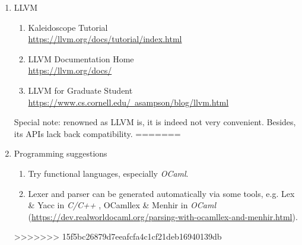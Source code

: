 \documentclass{article}
\begin{document}
\begin{enumerate}
    \item LLVM
    \begin{enumerate}
        \item Kaleidoscope Tutorial\\
        \href{https://llvm.org/docs/tutorial/index.html}{https://llvm.org/docs/tutorial/index.html}
        \item LLVM Documentation Home\\
        \href{https://llvm.org/docs/}{https://llvm.org/docs/}
        \item LLVM for Graduate Student\\
        \href{https://www.cs.cornell.edu/~asampson/blog/llvm.html}{https://www.cs.cornell.edu/~asampson/blog/llvm.html}
    \end{enumerate}    
    Special note: renowned as LLVM is, it is indeed not very convenient. Besides, its APIs lack back compatibility.
=======
    \item Programming suggestions
    \begin{enumerate}
        \item Try functional languages, especially \emph{OCaml}.
        \item Lexer and parser can be generated automatically  via some tools, e.g. Lex \& Yacc in \emph{C/C++} \cite{levine1992lex}, OCamllex \& Menhir in  \emph{OCaml} (\href{https://dev.realworldocaml.org/parsing-with-ocamllex-and-menhir.html}{https://dev.realworldocaml.org/parsing-with-ocamllex-and-menhir.html}).
    \end{enumerate}
    
>>>>>>> 15f5bc26879d7eeafcfa4c1cf21deb16940139db


\end{enumerate}
\end{document}
